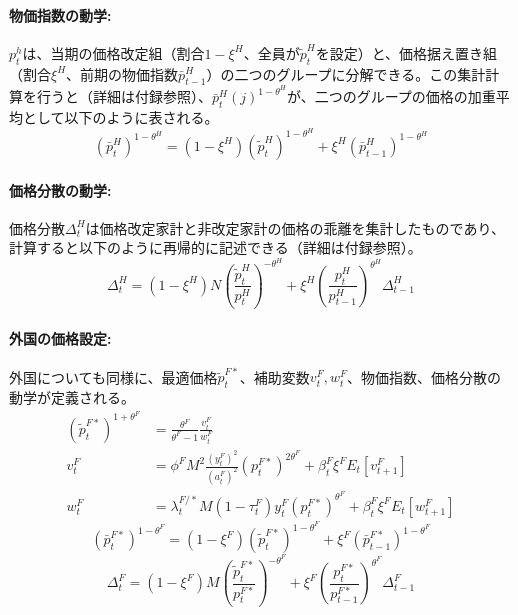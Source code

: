 \paragraph*{物価指数の動学:}\label{sec:chapter3_final_equations_pricing_ppi_h_dynamics}
\(p_t^h\)は、当期の価格改定組（割合\(1-\xi^H\)、全員が\(\widetilde{p}_t^H\)を設定）と、価格据え置き組（割合\(\xi^H\)、前期の物価指数\(\bar{p}_{t-1}^H\)）の二つのグループに分解できる。この集計計算を行うと（詳細は付録参照）、\(\bar{p}_t^H(j)^{1-\theta^H}\)が、二つのグループの価格の加重平均として以下のように表される。
\begin{equation}
(\bar{p}_t^H)^{1-\theta^H}=(1-\xi^H)(\widetilde{p}_t^H)^{1-\theta^H}+\xi^H(\bar{p}_{t-1}^H)^{1-\theta^H}
\label{form:model_final_equations_pricing_ppi_h}
\end{equation}

\paragraph*{価格分散の動学:}\label{sec:chapter3_final_equations_pricing_delta_h_dynamics}
価格分散\(\Delta_t^H\)は価格改定家計と非改定家計の価格の乖離を集計したものであり、計算すると以下のように再帰的に記述できる（詳細は付録参照）。
\begin{equation}
\Delta_t^H=(1-\xi^H)N\left(\frac{\widetilde{p}_t^H}{p_t^H}\right)^{-\theta^H}+\xi^H\left(\frac{p_t^H}{p_{t-1}^H}\right)^{\theta^H}\Delta_{t-1}^H
\label{form:model_final_equations_pricing_delta_h}
\end{equation}

\paragraph*{外国の価格設定:}\label{sec:chapter3_final_equations_pricing_foreign_dynamics}
外国についても同様に、最適価格\(\widetilde{p}_t^{F*}\)、補助変数\(v_t^F,w_t^F\)、物価指数、価格分散の動学が定義される。
\begin{align}
(\widetilde{p}_t^{F*})^{1+\theta^F}&=\frac{\theta^F}{\theta^F-1}\frac{v_t^F}{w_t^F} \label{form:model_final_equations_pricing_opt_p_f} \\
v_t^F&=\phi^FM^2\frac{(y_t^F)^2}{(a_t^F)^2}(p_t^{F*})^{2\theta^F}+\beta_t^F\xi^FE_t[v_{t+1}^F] \label{form:model_final_equations_pricing_v_f} \\
w_t^F&=\lambda_t^{F/*}M(1-\tau_t^F)y_t^F(p_t^{F*})^{\theta^F}+\beta_t^F\xi^FE_t[w_{t+1}^F] \label{form:model_final_equations_pricing_w_f}
\end{align}
\begin{equation}
(\bar{p}_t^{F*})^{1-\theta^F}=(1-\xi^F)(\widetilde{p}_t^{F*})^{1-\theta^F}+\xi^F(\bar{p}_{t-1}^{F*})^{1-\theta^F}
\label{form:model_final_equations_pricing_ppi_f}
\end{equation}
\begin{equation}
\Delta_t^F=(1-\xi^F)M\left(\frac{\widetilde{p}_t^{F*}}{p_t^{F*}}\right)^{-\theta^F}+\xi^F\left(\frac{p_t^{F*}}{p_{t-1}^{F*}}\right)^{\theta^F}\Delta_{t-1}^F
\label{form:model_final_equations_pricing_delta_f}
\end{equation}


